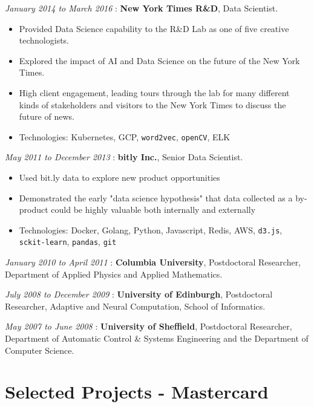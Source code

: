 \documentclass[line, overlapped]{res}
\providecommand{\tightlist}{%
  \setlength{\itemsep}{0pt}\setlength{\parskip}{0pt}}
\begin{document}
\begin{resume}
  \emph{January 2014 to March 2016} : \textbf{New York Times R\&D}, Data
  Scientist.
  \begin{itemize}
  \tightlist
	  \item Provided Data Science capability to the R\&D Lab as one of five creative technologists. 
	\item Explored the impact of AI and Data Science on the future of the New York Times.
	\item High client engagement, leading tours through the lab for many different kinds of stakeholders and visitors to the New York Times to discuss the future of news.
	\item Technologies: Kubernetes, GCP, \texttt{word2vec}, \texttt{openCV}, ELK
  \end{itemize}

  \emph{May 2011 to December 2013} : \textbf{bitly Inc.}, Senior Data Scientist.
  \begin{itemize}
  \tightlist
	\item Used bit.ly data to explore new product opportunities
	\item Demonstrated the early "data science hypothesis" that data collected as a by-product could be highly valuable both internally and externally
	\item Technologies: Docker, Golang, Python, Javascript, Redis, AWS, \texttt{d3.js}, \texttt{sckit-learn}, \texttt{pandas}, \texttt{git}
  \end{itemize}

  \emph{January 2010 to April 2011} : \textbf{Columbia University},
  Postdoctoral Researcher, Department of Applied Physics and Applied
  Mathematics.

  \emph{July 2008 to December 2009} : \textbf{University of Edinburgh},
  Postdoctoral Researcher, Adaptive and Neural Computation, School of
  Informatics.

  \emph{May 2007 to June 2008} : \textbf{University of Sheffield},
  Postdoctoral Researcher, Department of Automatic Control \& Systems
  Engineering and the Department of Computer Science.

\section{Selected Projects - Mastercard}


\end{resume}
\end{document}
